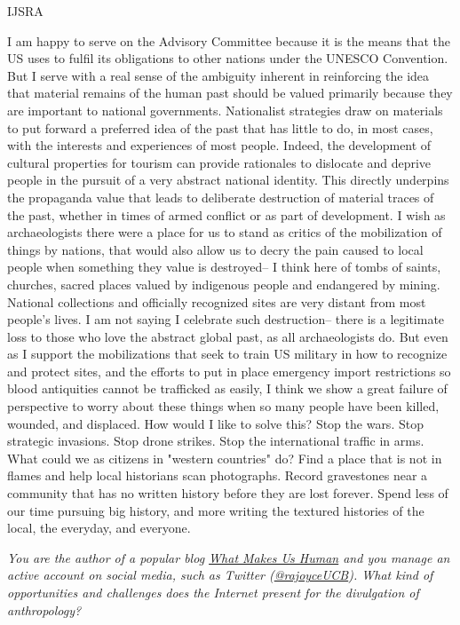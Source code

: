 \begin{labeling}{IJSRA}
\item[RAJ] I am happy to serve on the Advisory Committee because it is the means that the US uses to fulfil its obligations to other nations under the UNESCO Convention. But I serve with a real sense of the ambiguity inherent in reinforcing the idea that material remains of the human past should be valued primarily because they are important to national governments. Nationalist strategies draw on materials to put forward a preferred idea of the past that has little to do, in most cases, with the interests and experiences of most people. Indeed, the development of cultural properties for tourism can provide rationales to dislocate and deprive people in the pursuit of a very abstract national identity. This directly underpins the propaganda value that leads to deliberate destruction of material traces of the past, whether in times of armed conflict or as part of development. I wish as archaeologists there were a place for us to stand as critics of the mobilization of things by nations, that would also allow us to decry the pain caused to local people when something they value is destroyed-- I think here of tombs of saints, churches, sacred places valued by indigenous people and endangered by mining. National collections and officially recognized sites are very distant from most people's lives. I am not saying I celebrate such destruction-- there is a legitimate loss to those who love the abstract global past, as all archaeologists do. But even as I support the mobilizations that seek to train US military in how to recognize and protect sites, and the efforts to put in place emergency import restrictions so blood antiquities cannot be trafficked as easily, I think we show a great failure of perspective to worry about these things when so many people have been killed, wounded, and displaced. How would I like to solve this? Stop the wars. Stop strategic invasions. Stop drone strikes. Stop the international traffic in arms. What could we as citizens in "western countries" do? Find a place that is not in flames and help local historians scan photographs. Record gravestones near a community that has no written history before they are lost forever. Spend less of our time pursuing big history, and more writing the textured histories of the local, the everyday, and everyone.

\item[IJSRA] \textit{You are the author of a popular blog \href{https://www.psychologytoday.com/blog/what-makes-us-human}{What Makes Us Human} and you manage an active account on social media, such as Twitter (\href{https://twitter.com/rajoyceucb}{@rajoyceUCB}). What kind of opportunities and challenges does the Internet present for the divulgation of anthropology?}
	

\end{labeling}
